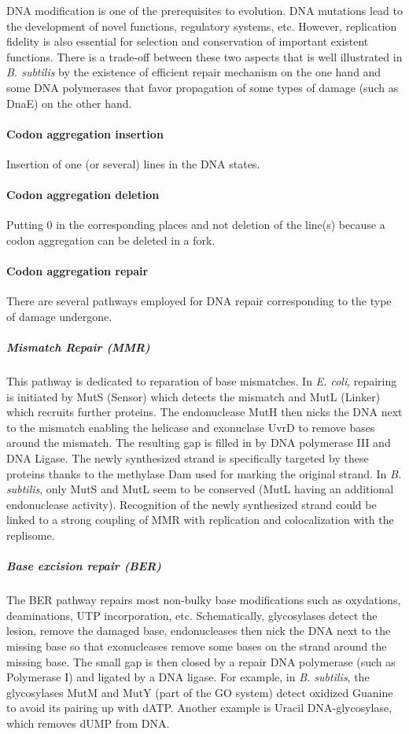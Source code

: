 DNA modification is one of the prerequisites to evolution. DNA mutations lead to the development of novel functions, regulatory systems, etc. However, replication fidelity is also essential for selection and conservation of important existent functions. There is a trade-off between these two aspects that is well illustrated in \textit{B. subtilis} by the existence of efficient repair mechanism on the one hand and some DNA polymerases that favor propagation of some types of damage (such as DnaE) on the other hand.



\paragraph{Codon aggregation insertion}
Insertion of one (or several) lines in the DNA states.

\paragraph{Codon aggregation deletion}
Putting 0 in the corresponding places and not deletion of the line(s) because a codon aggregation can be deleted in a fork.

\paragraph{Codon aggregation repair}
There are several pathways employed for DNA repair corresponding to the type of damage undergone.

\subparagraph{Mismatch Repair (MMR)} This pathway is dedicated to reparation of base mismatches. In \textit{E. coli}, repairing is initiated by MutS (Sensor) which detects the mismatch and MutL (Linker) which recruits further proteins. The endonuclease MutH then nicks the DNA next to the mismatch enabling the helicase and exonuclase UvrD to remove bases around the mismatch. The resulting gap is filled in by DNA polymerase III and DNA Ligase. The newly synthesized strand is specifically targeted by these proteins thanks to the methylase Dam used for marking the original strand. In \textit{B. subtilis}, only MutS and MutL seem to be conserved (MutL having an additional endonuclease activity). Recognition of the newly synthesized strand could be linked to a strong coupling of MMR with replication and colocalization with the replisome.

\subparagraph{Base excision repair (BER)} The BER pathway repairs most non-bulky base modifications such as oxydations, deaminations, UTP incorporation, etc. Schematically, glycosylases detect the lesion, remove the damaged base, endonucleases then nick the DNA next to the missing base so that exonucleases remove some bases on the strand around the missing base. The small gap is then closed by a repair DNA polymerase (such as Polymerase I) and ligated by a DNA ligase. For example, in \textit{B. subtilis}, the glycosylases MutM and MutY (part of the GO system) detect oxidized Guanine to avoid its pairing up with dATP. Another example is Uracil DNA-glycosylase, which removes dUMP from DNA. 

